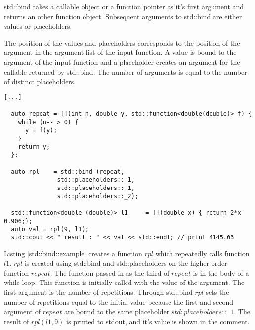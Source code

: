 \documentclass[12pt,fleqn]{article}
\begin{document}
std::bind takes a callable object or a function pointer as it's first argument and returns an other function object.
Subsequent arguments to std::bind are either values or placeholders.

The position of the values and placeholders corresponds to the position of the argument in the argument list of the input function. 
A value is bound to the argument of the input function and a placeholder creates an argument for the callable returned by std::bind.
The number of arguments is equal to the number of distinct placeholders.
%
\begin{lstlisting}[caption=std::bind example, label=std::bind::example]
[...]
 
  auto repeat = [](int n, double y, std::function<double(double)> f) { 
    while (n-- > 0) {
      y = f(y);
    }
    return y;
  };

  auto rpl    = std::bind (repeat,
			   std::placeholders::_1,
			   std::placeholders::_1,
			   std::placeholders::_2);

  std::function<double (double)> l1     = [](double x) { return 2*x-0.906;};
  auto val = rpl(9, l1);
  std::cout << " result : " << val << std::endl; // print 4145.03

\end{lstlisting}
%
Listing \ref{std::bind::example} creates a function $rpl$ which repeatedly calls function $l1$. 
$rpl$ is created using std::bind and std::placeholders on the higher order function $repeat$.
The function passed in as the third of $repeat$ is in the body of a while loop. 
This function is initially called with the value of the  argument.
The first argument is the number of repetitions.
Through std::bind $rpl$ sets the number of repetitions equal to the initial value because the first and second argument of $repeat$ are bound to the same placeholder $std:placeholders::\_1$. 
The result of $rpl(l1,9)$  is printed to stdout, and it's value is shown in the comment.
\end{document}

